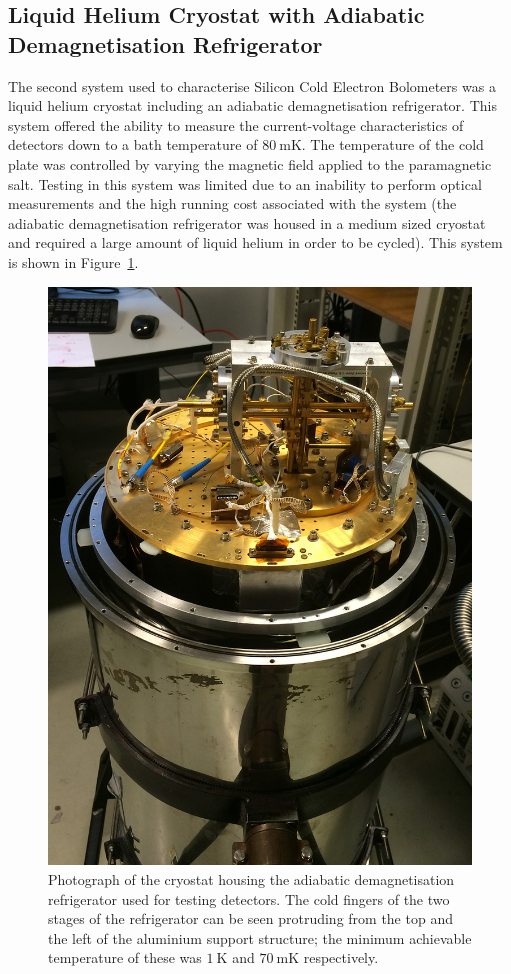 \subsection{Liquid Helium Cryostat with Adiabatic Demagnetisation Refrigerator}
\label{ssec:ADR}
The second system used to characterise Silicon Cold Electron Bolometers was a liquid helium cryostat including an adiabatic demagnetisation refrigerator. This system offered the ability to measure the current-voltage characteristics of detectors down to a bath temperature of $80~\mathrm{mK}$. The temperature of the cold plate was controlled by varying the magnetic field  applied to the paramagnetic salt. Testing in this system was limited due to an inability to perform optical measurements and the high running cost associated with the system (the adiabatic demagnetisation refrigerator was housed in a medium sized cryostat and required a large amount of liquid helium in order to be cycled). This system is shown in Figure~\ref{fig:ADRphoto}.
\begin{figure}[tb]
\begin{center}
\includegraphics[height = 0.4\textheight]{figures/ADRphoto}
\caption[Photograph of the cryostat housing the adiabatic demagnetisation refrigerator used for testing detectors]{Photograph of the cryostat housing the adiabatic demagnetisation refrigerator used for testing detectors. The cold fingers of the two stages of the refrigerator can be seen protruding from the top and the left of the aluminium support structure; the minimum achievable temperature of these was $1~\mathrm{K}$ and $70~\mathrm{mK}$ respectively.}
\label{fig:ADRphoto}
\end{center}
\end{figure}
